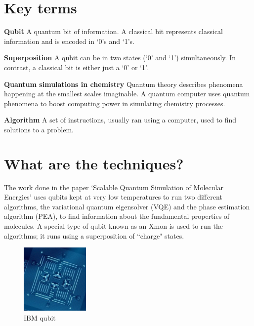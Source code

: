 \documentclass[14pt,landscape,color=UCLdarkred,margin=3cm]{uclposter}
\begin{document}
\begin{multicols}{3}
\section*{Key terms}
\begin{highlightbox}
	\textbf{Qubit} A quantum bit of information. A classical bit represents classical information and is encoded in `0's and `1's.
\end{highlightbox}

\begin{highlightbox}
  \textbf{Superposition} A qubit can be in two states (`0' and `1') simultaneously. In contrast, a classical bit is either just a `0' or `1'.
\end{highlightbox}



\begin{highlightbox}
\textbf{Quantum simulations in chemistry} Quantum theory describes phenomena happening at the smallest scales imaginable. A quantum computer uses quantum phenomena to boost computing power in simulating chemistry processes.

\end{highlightbox}

\begin{highlightbox}
\textbf{Algorithm} A set of instructions, usually ran using a computer, used to find solutions to a problem. 
\end{highlightbox}

\columnbreak

\section*{What are the techniques?}


The work done in the paper `Scalable Quantum Simulation of Molecular Energies' uses qubits kept at very low temperatures to run two different algorithms, the variational quantum eigensolver (VQE) and the phase estimation algorithm (PEA),  to find information about the fundamental properties of molecules. A special type of qubit known as an Xmon is used to run the algorithms; it runs using a superposition of ``charge" states.
\\
\begin{figure}[H]
  \begin{center}
\setlength{\fboxsep}{0.5em}
  \begin{minipage}[c]{9em}
  \begin{center}
  \includegraphics[width=9em]{4_Qubit.png}
    \caption{IBM qubit}
  \end{center}
    

\end{minipage}
\end{center}
\end{figure}
\end{multicols}
\end{document}
